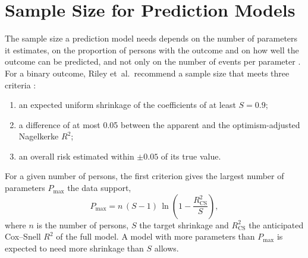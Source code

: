 \providecommand{\clarify}[1]{\textcolor{red}{\textbf{Clarification needed:} #1}}
\section{Sample Size for Prediction Models}
\label{sec:tech-sample-size}

The sample size a prediction model needs depends on the number of parameters it estimates, on the proportion of persons with the outcome and on how well the outcome can be predicted, and not only on the number of events per parameter \cite{riley2020samplesize}.
For a binary outcome, Riley et~al.\ recommend a sample size that meets three criteria \cite{riley2020samplesize}:
\begin{enumerate}
  \item an expected uniform shrinkage of the coefficients of at least $S = 0.9$;
  \item a difference of at most 0.05 between the apparent and the optimism-adjusted Nagelkerke $R^2$;
  \item an overall risk estimated within $\pm 0.05$ of its true value.
\end{enumerate}

For a given number of persons, the first criterion gives the largest number of parameters $P_{\max}$ the data support,
\begin{equation}
  P_{\max} = n\,(S-1)\,\ln\!\left(1 - \frac{R^2_{\mathrm{CS}}}{S}\right),
  \label{eq:tech-pmax}
\end{equation}
where $n$ is the number of persons, $S$ the target shrinkage and $R^2_{\mathrm{CS}}$ the anticipated Cox--Snell $R^2$ of the full model.
A model with more parameters than $P_{\max}$ is expected to need more shrinkage than $S$ allows.

